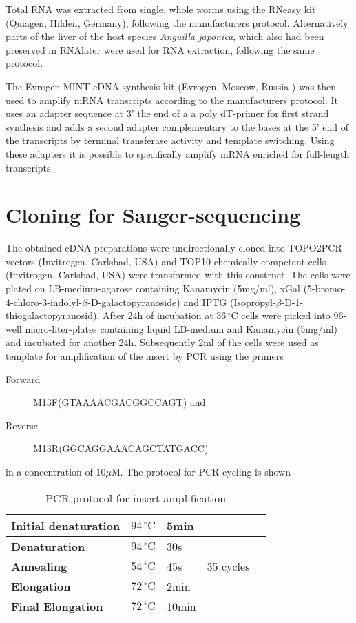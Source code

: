 Total RNA was extracted from single, whole worms using the RNeasy kit
(Quiagen, Hilden, Germany), following the manufacturers
protocol. Alternatively parts of the liver of the host species
\textit{Anguilla japonica}, which also had been preserved in RNAlater
were used for RNA extraction, following the same protocol.

The Evrogen MINT cDNA synthesis kit (Evrogen, Moscow, Russia ) was
then used to amplify mRNA transcripts according to the manufacturers
protocol. It uses an adapter sequence at 3' the end of a a poly
dT-primer for first strand synthesis and adds a second adapter
complementary to the bases at the 5' end of the transcripts by
terminal transferase activity and template switching. Using these
adapters it is possible to specifically amplify mRNA enriched for
full-length transcripts.

\section{Cloning for Sanger-sequencing}

The obtained cDNA preparations were undirectionally cloned into
TOPO2PCR-vectors (Invitrogen, Carlsbad, USA) and TOP10 chemically
competent cells (Invitrogen, Carlsbad, USA) were transformed with this
construct. The cells were plated on LB-medium-agarose containing
Kanamycin (5mg/ml), xGal
(5-bromo-4-chloro-3-indolyl-$\beta$-D-galactopyranoside) and IPTG
(Isopropyl-$\beta$-D-1-thiogalactopyranosid). After 24h of incubation
at $36\,^{\circ}\mathrm{C} $ cells were picked into 96-well
micro-liter-plates containing liquid LB-medium and Kanamycin (5mg/ml)
and incubated for another 24h. Subsequently 2ml of the cells were used
as template for amplification of the insert by PCR using the primers
\begin{description}
\item[Forward] M13F(GTAAAACGACGGCCAGT) and
\item[Reverse] M13R(GGCAGGAAACAGCTATGACC)
\end{description}
in a concentration of 10$\mu$M. The protocol for PCR cycling is shown

\begin{table}[h]
  \centering
  \begin{tabular}{lllll} 
    \textbf{Initial denaturation} &  $ 94\, ^{\circ}\mathrm{C} $ & 5min &  &\\ 
    \hline
    \textbf{Denaturation} &  $ 94\, ^{\circ}\mathrm{C} $ &30s& & \\ 
    \textbf{Annealing} &   $ 54\, ^{\circ}\mathrm{C} $ & 45s & 35 cycles &\\ 
    \textbf{Elongation} &   $ 72\, ^{\circ}\mathrm{C} $ & 2min &  &\\ 
    \hline
    \textbf{Final Elongation} &   $ 72\, ^{\circ}\mathrm{C} $ & 10min &\\ 
  \end{tabular}   
  \caption{PCR protocol for insert amplification}
  \label{tab:PCR}
\end{table}

